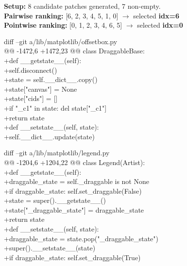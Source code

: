 \noindent\textbf{Setup:} 8 candidate patches generated, 7 non-empty.\\
\textbf{Pairwise ranking:} [6, 2, 3, 4, 5, 1, 0] \quad $\rightarrow$ selected \textbf{idx=6} \checkmark\\
\textbf{Pointwise ranking:} [0, 1, 2, 3, 4, 6, 5] \quad $\rightarrow$ selected \textbf{idx=0} 

\begin{tcolorbox}[
    colback=green!5,
    colframe=green!60!black,
    title={\textbf{Pairwise-Selected Patch (idx=6): Resolves the issue \checkmark}},
    coltitle=white,
    fonttitle=\small\bfseries,
    breakable,
    enhanced
]
\small\ttfamily
diff --git a/lib/matplotlib/offsetbox.py\\
@@ -1472,6 +1472,23 @@ class DraggableBase:\\
+\quad def \_\_getstate\_\_(self):\\
+\quad\quad self.disconnect()\\
+\quad\quad state = self.\_\_dict\_\_.copy()\\
+\quad\quad state["canvas"] = None\\
+\quad\quad state["cids"] = []\\
+\quad\quad if "\_c1" in state: del state["\_c1"]\\
+\quad\quad return state\\
+\quad def \_\_setstate\_\_(self, state):\\
+\quad\quad self.\_\_dict\_\_.update(state)
\end{tcolorbox}

\begin{tcolorbox}[
    colback=red!5,
    colframe=red!60!black,
    title={\textbf{Pointwise-Selected Patch (idx=0): Does not resolve the issue \ding{55}}},
    coltitle=white,
    fonttitle=\small\bfseries,
    breakable,
    enhanced
]
\small\ttfamily
diff --git a/lib/matplotlib/legend.py\\
@@ -1204,6 +1204,22 @@ class Legend(Artist):\\
+\quad def \_\_getstate\_\_(self):\\
+\quad\quad draggable\_state = self.\_draggable is not None\\
+\quad\quad if draggable\_state: self.set\_draggable(False)\\
+\quad\quad state = super().\_\_getstate\_\_()\\
+\quad\quad state["\_draggable\_state"] = draggable\_state\\
+\quad\quad return state\\
+\quad def \_\_setstate\_\_(self, state):\\
+\quad\quad draggable\_state = state.pop("\_draggable\_state")\\
+\quad\quad super().\_\_setstate\_\_(state)\\
+\quad\quad if draggable\_state: self.set\_draggable(True)
\end{tcolorbox}

